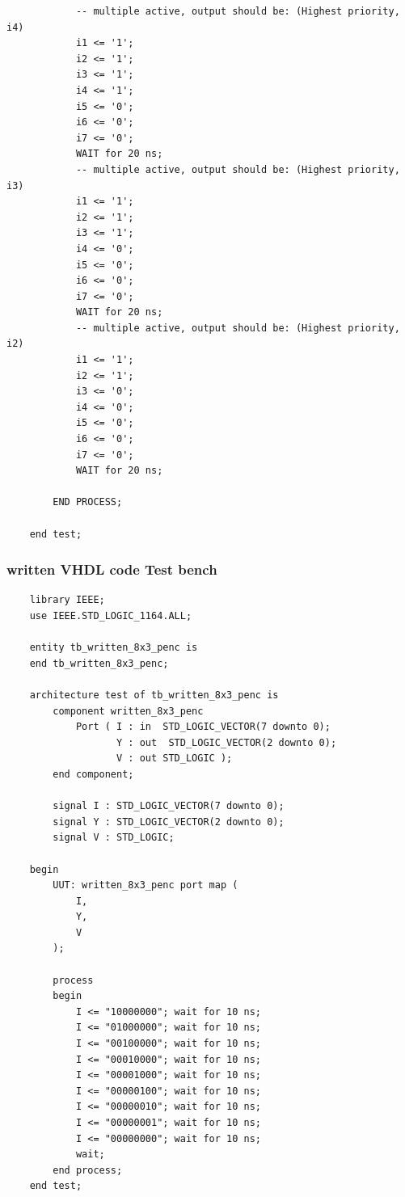 \documentclass[12pt]{article}
\begin{document}
\begin{verbatim}
            -- multiple active, output should be: (Highest priority, i4)
            i1 <= '1';
            i2 <= '1';
            i3 <= '1';
            i4 <= '1';
            i5 <= '0';
            i6 <= '0';
            i7 <= '0';
            WAIT for 20 ns;
            -- multiple active, output should be: (Highest priority, i3)
            i1 <= '1';
            i2 <= '1';
            i3 <= '1';
            i4 <= '0';
            i5 <= '0';
            i6 <= '0';
            i7 <= '0';
            WAIT for 20 ns;
            -- multiple active, output should be: (Highest priority, i2)
            i1 <= '1';
            i2 <= '1';
            i3 <= '0';
            i4 <= '0';
            i5 <= '0';
            i6 <= '0';
            i7 <= '0';
            WAIT for 20 ns;
    
        END PROCESS;
    
    end test;

\end{verbatim}

\subsubsection{written VHDL code Test bench}
\begin{verbatim}
    library IEEE;
    use IEEE.STD_LOGIC_1164.ALL;
    
    entity tb_written_8x3_penc is
    end tb_written_8x3_penc;
    
    architecture test of tb_written_8x3_penc is
        component written_8x3_penc
            Port ( I : in  STD_LOGIC_VECTOR(7 downto 0);
                   Y : out  STD_LOGIC_VECTOR(2 downto 0);
                   V : out STD_LOGIC );
        end component;
    
        signal I : STD_LOGIC_VECTOR(7 downto 0);
        signal Y : STD_LOGIC_VECTOR(2 downto 0);
        signal V : STD_LOGIC;
    
    begin
        UUT: written_8x3_penc port map (
            I,
            Y,
            V
        );
    
        process
        begin
            I <= "10000000"; wait for 10 ns;
            I <= "01000000"; wait for 10 ns;
            I <= "00100000"; wait for 10 ns;
            I <= "00010000"; wait for 10 ns;
            I <= "00001000"; wait for 10 ns;
            I <= "00000100"; wait for 10 ns;
            I <= "00000010"; wait for 10 ns;
            I <= "00000001"; wait for 10 ns;
            I <= "00000000"; wait for 10 ns;
            wait;
        end process;
    end test;

\end{verbatim}
\end{document}
